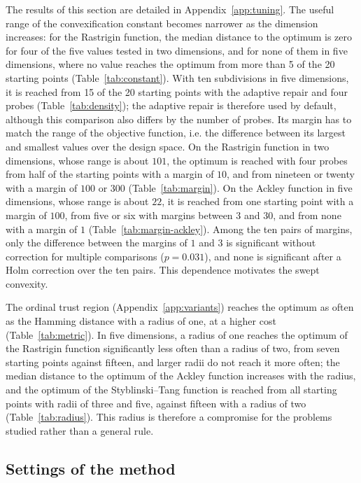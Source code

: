 \documentclass[pdflatex,sn-basic]{sn-jnl}
\begin{document}
The results of this section are detailed in Appendix~\ref{app:tuning}. The
useful range of the convexification constant becomes narrower as the dimension
increases: for the Rastrigin function, the median distance to the optimum is
zero for four of the five values tested in two dimensions, and for none of them
in five dimensions, where no value reaches the optimum from more than 5 of the
20 starting points (Table~\ref{tab:constant}). With ten subdivisions in five
dimensions, it is reached from 15 of the 20 starting points with the adaptive repair
and four probes (Table~\ref{tab:density}); the adaptive repair is therefore used
by default, although this comparison also differs by the number of probes. Its
margin has to match the range of the objective function, i.e. the difference
between its largest and smallest values over the design space. On the Rastrigin
function in two dimensions, whose range is about $101$, the optimum is reached
with four probes from half of the starting points with a margin of $10$, and
from nineteen or twenty with a margin of $100$ or $300$
(Table~\ref{tab:margin}). On the Ackley function in five dimensions, whose range
is about $22$, it is reached from one starting point with a margin of $100$, from
five or six with margins between $3$ and $30$, and from none with a margin of
$1$ (Table~\ref{tab:margin-ackley}). Among the ten pairs of margins, only the
difference between the margins of $1$ and $3$ is significant without correction
for multiple comparisons ($p = 0.031$), and none is significant after a Holm
correction over the ten pairs. This dependence motivates the swept convexity.

The ordinal trust region (Appendix~\ref{app:variants}) reaches the optimum as
often as the Hamming distance
with a radius of one, at a higher cost (Table~\ref{tab:metric}). In five
dimensions, a radius of one reaches the optimum of the Rastrigin function
significantly less often than a radius of two, from seven starting points
against fifteen, and larger radii do not reach it more often; the median
distance to the optimum of the Ackley function increases with the radius, and
the optimum of the Styblinski--Tang function is reached from all starting
points with radii of three and five, against fifteen with a radius of two
(Table~\ref{tab:radius}). This radius is therefore a compromise for the problems
studied rather than a general rule.

\subsection{Settings of the method}\label{sec:variants}
\end{document}
